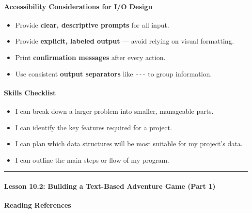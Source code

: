 \documentclass[
  justified,
  openright,
]{tufte-book}
\let\subsection\paragraph
\let\paragraph\paragraph
\let\subsection\paragraph
\let\paragraph\paragraph
\providecommand{\tightlist}{%
  \setlength{\itemsep}{0pt}\setlength{\parskip}{0pt}}
\begin{document}
\subsection{Accessibility Considerations for I/O
Design}\label{accessibility-considerations-for-io-design}

\begin{itemize}
\tightlist
\item
  Provide \textbf{clear, descriptive prompts} for all input.
\item
  Provide \textbf{explicit, labeled output} --- avoid relying on visual
  formatting.
\item
  Print \textbf{confirmation messages} after every action.
\item
  Use consistent \textbf{output separators} like \texttt{-\/-\/-} to
  group information.
\end{itemize}

\subsection{Skills Checklist}\label{skills-checklist-47}

\begin{itemize}
\tightlist
\item[$\square$]
  I can break down a larger problem into smaller, manageable parts.
\item[$\square$]
  I can identify the key features required for a project.
\item[$\square$]
  I can plan which data structures will be most suitable for my
  project's data.
\item[$\square$]
  I can outline the main steps or flow of my program.
\end{itemize}

\begin{center}\rule{0.5\linewidth}{0.5pt}\end{center}

\subsection{Lesson 10.2: Building a Text-Based Adventure Game (Part
1)}\label{lesson-10.2-building-a-text-based-adventure-game-part-1}

\subsection{Reading References}\label{reading-references-29}
\end{document}
